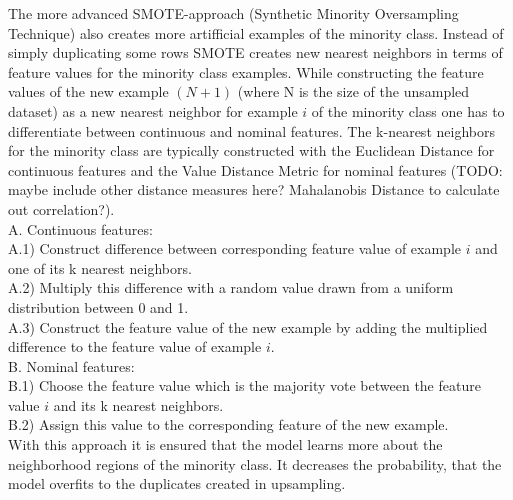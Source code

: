\documentclass[12pt,titlepage]{article}
\begin{document}
The more advanced SMOTE-approach (Synthetic Minority Oversampling Technique) \cite{smote} also creates more artifficial examples of the minority class. Instead of simply duplicating some rows SMOTE creates new nearest neighbors in terms of feature values for the minority class examples. While constructing the feature values of the new example $(N + 1)$ (where N is the size of the unsampled dataset) as a new nearest neighbor for example $i$ of the
minority class one has to differentiate between continuous and nominal features. The k-nearest neighbors for the minority class are typically constructed with the Euclidean Distance for continuous features and the Value Distance Metric for nominal features (TODO: maybe include other distance measures here? Mahalanobis Distance to calculate out correlation?).\\
A. Continuous features: \\
A.1) Construct difference between corresponding feature value of example $i$ and one of its k nearest neighbors. \\
A.2) Multiply this difference with a random value drawn from a uniform distribution between 0 and 1. \\
A.3) Construct the feature value of the new example by adding the multiplied difference to the feature value of example $i$. \\
B. Nominal features: \\
B.1) Choose the feature value which is the majority vote between the feature value $i$ and its k nearest neighbors. \\
B.2) Assign this value to the corresponding feature of the new example. \\
With this approach it is ensured that the model learns more about the neighborhood regions of the minority class. It decreases the probability, that the model overfits to the duplicates created in upsampling. \\
\end{document}
